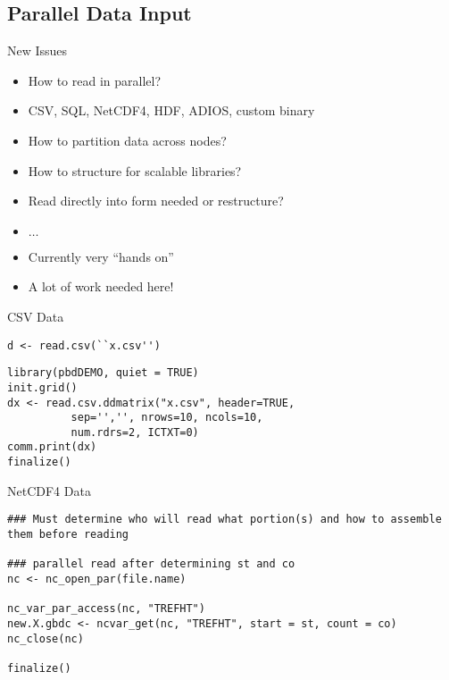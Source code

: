 \subsection{Parallel Data Input}

\begin{frame}
  \begin{block}{New Issues}\pause
    \begin{itemize}
    \item How to read in parallel?
    \item CSV, SQL, NetCDF4, HDF, ADIOS, custom binary
    \item How to partition data across nodes?
    \item How to structure for scalable libraries?
    \item Read directly into form needed or restructure?
    \item $\ldots$
    \item Currently very ``hands on''
    \item A lot of work needed here!
    \end{itemize}
  \end{block}
\end{frame}

\begin{frame}
  \begin{exampleblock}{CSV Data}\pause
\begin{lstlisting}[title=Serial Code]
d <- read.csv(``x.csv'')
\end{lstlisting}

\begin{lstlisting}[title=Parallel Code 0\_readcsv.r]
library(pbdDEMO, quiet = TRUE)
init.grid()
dx <- read.csv.ddmatrix("x.csv", header=TRUE,
          sep='','', nrows=10, ncols=10,
          num.rdrs=2, ICTXT=0)
comm.print(dx)
finalize()
\end{lstlisting}
  \end{exampleblock}
\end{frame}

\begin{frame}
  \begin{exampleblock}{NetCDF4 Data}\pause
    \begin{lstlisting}[title=Parallel Read]
### Must determine who will read what portion(s) and how to assemble them before reading

### parallel read after determining st and co
nc <- nc_open_par(file.name)

nc_var_par_access(nc, "TREFHT")
new.X.gbdc <- ncvar_get(nc, "TREFHT", start = st, count = co)
nc_close(nc)

finalize()
    \end{lstlisting}
  \end{exampleblock}
\end{frame}

